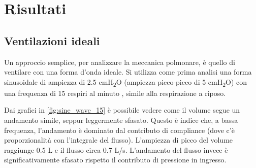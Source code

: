 \section{Risultati}

\subsection{Ventilazioni ideali}

Un approccio semplice, per analizzare la meccanica polmonare, è quello di ventilare con una forma d'onda ideale. Si utilizza come prima analisi una forma sinusoidale di ampiezza di 2.5 cmH\textsubscript{2}O (ampiezza picco-picco di 5 cmH\textsubscript{2}O) con una frequenza di 15 respiri al minuto \cite{khoo_physiological_2018}, simile alla respirazione a riposo.

Dai grafici in \cref{fig:sine_wave_15} è possibile vedere come il volume segue un andamento simile, seppur leggermente sfasato. Questo è indice che, a bassa frequenza, l'andamento è dominato dal contributo di compliance (dove c'è proporzionalità con l'integrale del flusso). L'ampiezza di picco del volume raggiunge 0.5 L e il flusso circa 0.7 L/s. L'andamento del flusso invece è significativamente sfasato rispetto il contributo di pressione in ingresso. 

